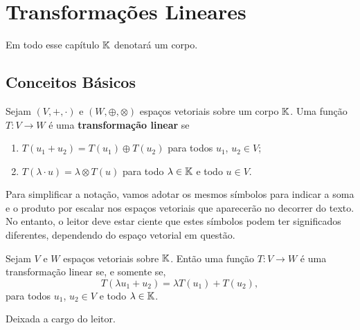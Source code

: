 
\chapter{Transformações Lineares}

Em todo esse capítulo $\mathbb{K}$ denotará um corpo.

\section{Conceitos Básicos}

\begin{definicao}
	Sejam $(V, +, \cdot)$ e $(W, \oplus, \otimes)$ espaços vetoriais sobre um corpo $\mathbb{K}$. Uma função $T : V \to W$ é uma \textbf{transformação linear} se
	\begin{enumerate}
		\item $T(u_1 + u_2) = T(u_1) \oplus T(u_2)$ para todos $u_1$, $u_2 \in V$;
		\item $T(\lambda \cdot u) = \lambda \otimes T(u)$ para todo $\lambda \in \mathbb{K}$ e todo $u \in V$.
	\end{enumerate}
\end{definicao}

\begin{observacao}
	Para simplificar a notação, vamos adotar os mesmos símbolos para indicar a soma e o produto por escalar nos espaços vetoriais que aparecerão no decorrer do texto. No entanto, o leitor deve estar ciente que estes símbolos podem ter significados diferentes, dependendo do espaço vetorial em questão.
\end{observacao}

\begin{lema}
	Sejam $V$ e $W$ espaços vetoriais sobre $\mathbb{K}$. Então uma função $T : V \to W$ é uma transformação linear se, e somente se,
	\[
		T(\lambda u_1 + u_2) = \lambda T(u_1) + T(u_2),
	\]
	para todos $u_1$, $u_2 \in V$ e todo $\lambda \in \mathbb{K}$.
\end{lema}
\begin{prova}
	Deixada a cargo do leitor.
\end{prova}

